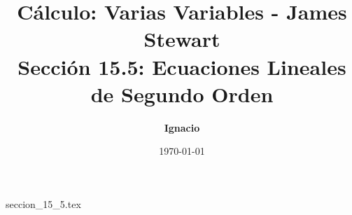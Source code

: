 \documentclass[11pt,spanish,oneside]{report}
\title{\textbf{Cálculo: Varias Variables - James Stewart} \\ \Large Sección 15.5: Ecuaciones Lineales de Segundo Orden}
\author{\textbf{Ignacio}}
\date{\today}
\begin{document}
\maketitle

{seccion_15_5.tex}
\end{document}
